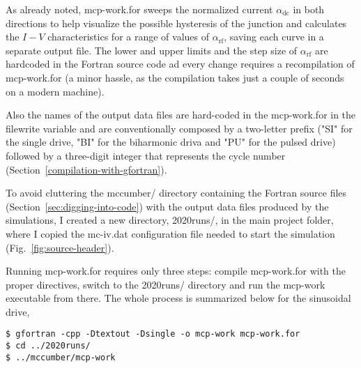 As already noted, \textsf{mcp-work.for} sweeps the normalized current $\alpha_\mathrm{dc}$ in both directions to help visualize the possible hysteresis of the junction and calculates the $I - V$ characteristics for a range of values of $\alpha_\mathrm{rf}$, saving each curve in a separate output file. 
The lower and upper limits and the step size of $\alpha_\mathrm{rf}$ are hardcoded in the Fortran source code ad every change requires a recompilation of \textsf{mcp-work.for} (a minor hassle, as the compilation takes just a couple of seconds on a modern machine).

Also the names of the output data files are hard-coded in the \textsf{mcp-work.for} in the \textsf{filewrite} variable and are conventionally composed by a two-letter prefix ("SI" for the single drive, "BI" for the biharmonic driva and "PU" for the pulsed drive) followed by a three-digit integer that represents the cycle number (Section~\ref{compilation-with-gfortran}).

To avoid cluttering the \textsf{mccumber/} directory containing the Fortran source files (Section~\ref{sec:digging-into-code}) with the output data files produced by the simulations, I created  a new directory, \textsf{2020runs/}, in the main project folder, where I copied the \textsf{mc-iv.dat} configuration file needed to start the simulation (Fig.~\ref{fig:source-header}).

Running \textsf{mcp-work.for} requires only three steps: compile \textsf{mcp-work.for} with the proper directives, switch to the \textsf{2020runs/} directory and run the \textsf{mcp-work} executable from there. The whole process is summarized below for the sinusoidal drive,

\begin{lstlisting}
$ gfortran -cpp -Dtextout -Dsingle -o mcp-work mcp-work.for
$ cd ../2020runs/
$ ../mccumber/mcp-work
\end{lstlisting}


